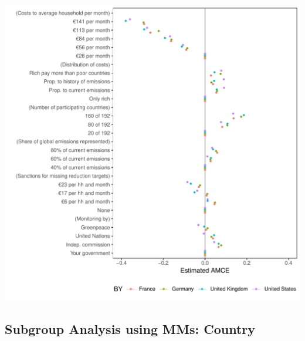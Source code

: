 \documentclass[a4paper,12pt]{article}\usepackage[]{graphicx}\usepackage[]{color}
\makeatletter
\def\maxwidth{ %
  \ifdim\Gin@nat@width>\linewidth
    \linewidth
  \else
    \Gin@nat@width
  \fi
}
\newenvironment{knitrout}{}{} %
\makeatother
\begin{document}
\begin{knitrout}
\color{fgcolor}
\includegraphics[width=\maxwidth]{figure/bechtel_subgroup_amce-1} 

\end{knitrout}

\clearpage



\clearpage

\subsection{Subgroup Analysis using MMs: Country}
\end{document}
